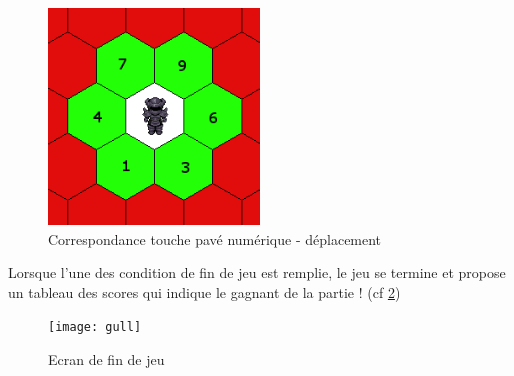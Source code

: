 		\begin{figure}[h!]
			\caption{Correspondance touche pavé numérique - déplacement}
			\label{fig:poskeys}
			\centering
			\includegraphics[width=0.5\textwidth]{res/pavnum_moves}
		\end{figure}
		
		Lorsque l'une des condition de fin de jeu est remplie, le jeu se termine et propose un tableau des scores qui indique le gagnant de la partie ! (cf \ref{fig:finjeu})
		\begin{figure}[h!]
			\caption{Ecran de fin de jeu}
			\label{fig:finjeu}
			\centering
			\texttt{[image: gull]}
		\end{figure}
